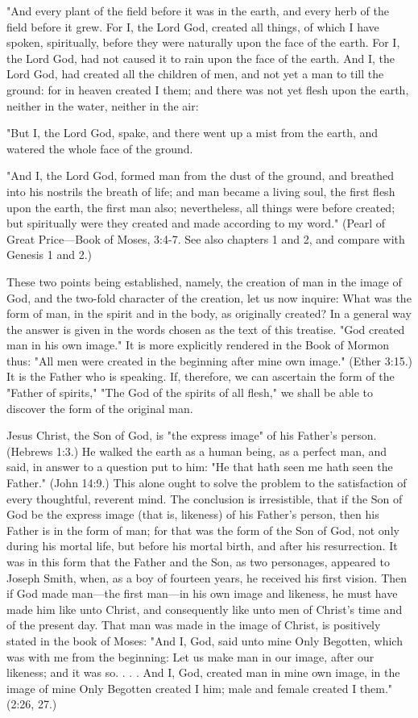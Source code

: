 "And every plant of the field before it was in the earth, and every herb of the field before it
grew. For I, the Lord God, created all things, of which I have spoken, spiritually, before they
were naturally upon the face of the earth. For I, the Lord God, had not caused it to rain upon
the face of the earth. And I, the Lord God, had created all the children of men, and not yet a
man to till the ground: for in heaven created I them; and there was not yet flesh upon the
earth, neither in the water, neither in the air:

"But I, the Lord God, spake, and there went up a mist from the earth, and watered the whole
face of the ground.

"And I, the Lord God, formed man from the dust of the ground, and breathed into his nostrils
the breath of life; and man became a living soul, the first flesh upon the earth, the first man
also; nevertheless, all things were before created; but spiritually were they created and made
according to my word." (Pearl of Great Price—Book of Moses, 3:4-7. See also chapters 1
and 2, and compare with Genesis 1 and 2.)

These two points being established, namely, the creation of man in the image of God, and the
two-fold character of the creation, let us now inquire: What was the form of man, in the spirit
and in the body, as originally created? In a general way the answer is given in the words
chosen as the text of this treatise. "God created man in his own image." It is more explicitly
rendered in the Book of Mormon thus: "All men were created in the beginning after mine
own image." (Ether 3:15.) It is the Father who is speaking. If, therefore, we can ascertain the
form of the "Father of spirits," "The God of the spirits of all flesh," we shall be able to
discover the form of the original man.

Jesus Christ, the Son of God, is "the express image" of his Father's person. (Hebrews 1:3.) He
walked the earth as a human being, as a perfect man, and said, in answer to a question put to
him: "He that hath seen me hath seen the Father." (John 14:9.) This alone ought to solve the
problem to the satisfaction of every thoughtful, reverent mind. The conclusion is irresistible,
that if the Son of God be the express image (that is, likeness) of his Father's person, then his
Father is in the form of man; for that was the form of the Son of God, not only during his
mortal life, but before his mortal birth, and after his resurrection. It was in this form that the
Father and the Son, as two personages, appeared to Joseph Smith, when, as a boy of fourteen
years, he received his first vision. Then if God made man—the first man—in his own image
and likeness, he must have made him like unto Christ, and consequently like unto men of
Christ's time and of the present day. That man was made in the image of Christ, is positively
stated in the book of Moses: "And I, God, said unto mine Only Begotten, which was with me
from the beginning: Let us make man in our image, after our likeness; and it was so. . . . And
I, God, created man in mine own image, in the image of mine Only Begotten created I him;
male and female created I them." (2:26, 27.)


